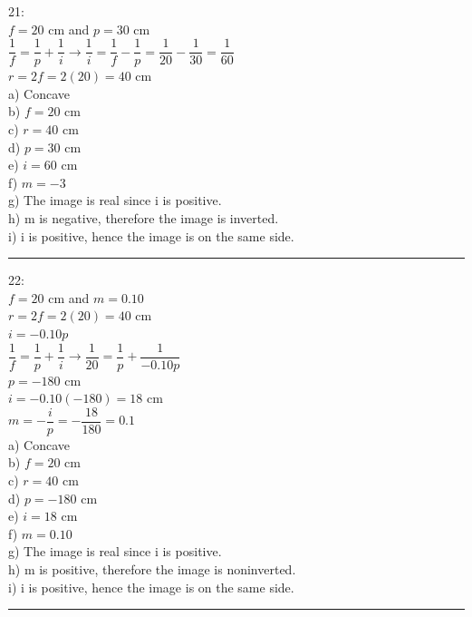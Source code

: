 \documentclass[fleqn]{article}
\begin{document}
\begin{enumerate}
    \textcolor{hwColor}{
      21: \\
      $f=20$ cm and $p=30$ cm \\
      $\dfrac{1}{f}=\dfrac{1}{p}+\dfrac{1}{i} \rightarrow \dfrac{1}{i}=\dfrac{1}{f}-\dfrac{1}{p}=\dfrac{1}{20}-\dfrac{1}{30}=\dfrac{1}{60}$ \\
      $r=2f=2(20)=40$ cm \\
      a) Concave \\
      b) $f=20$ cm \\
      c) $r=40$ cm \\
      d) $p=30$ cm \\
      e) $i=60$ cm \\
      f) $m=-3$ \\
      g) The image is real since i is positive. \\
      h) m is negative, therefore the image is inverted. \\
      i) i is positive, hence the image is on the same side. \\
    }

    \textcolor{hwColor}{
      \rule{15cm}{0.4pt}
    }

    \textcolor{hwColor}{
      22: \\
      $f=20$ cm and $m=0.10$ \\
      $r=2f=2(20)=40$ cm \\
      $i=-0.10p$ \\
      $\dfrac{1}{f}=\dfrac{1}{p}+\dfrac{1}{i} \rightarrow \dfrac{1}{20}=\dfrac{1}{p}+\dfrac{1}{-0.10p}$ \\
      $p=-180$ cm \\
      $i=-0.10(-180)=18$ cm \\
      $m=-\dfrac{i}{p}=-\dfrac{18}{180}=0.1$ \\
      a) Concave \\
      b) $f=20$ cm \\
      c) $r=40$ cm \\
      d) $p=-180$ cm \\
      e) $i=18$ cm \\
      f) $m=0.10$ \\
      g) The image is real since i is positive. \\
      h) m is positive, therefore the image is noninverted. \\
      i) i is positive, hence the image is on the same side. \\
    }

    \textcolor{hwColor}{
      \rule{15cm}{0.4pt}
    }


\end{enumerate}
\end{document}
